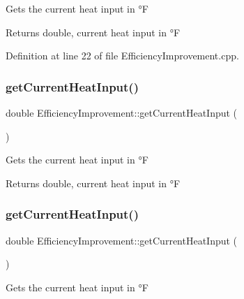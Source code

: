 Gets the current heat input in °F

\begin{DoxyReturn}{Returns}
double, current heat input in °F 
\end{DoxyReturn}


Definition at line 22 of file Efficiency\+Improvement.\+cpp.

\mbox{\label{class_efficiency_improvement_af43c4706cb5cd67ce58e9c4356e4564c}} 
\subsubsection{\texorpdfstring{get\+Current\+Heat\+Input()}{getCurrentHeatInput()}\hspace{0.1cm}{\footnotesize\ttfamily [2/3]}}
{\footnotesize\ttfamily double Efficiency\+Improvement\+::get\+Current\+Heat\+Input (\begin{DoxyParamCaption}{ }\end{DoxyParamCaption})}

Gets the current heat input in °F

\begin{DoxyReturn}{Returns}
double, current heat input in °F 
\end{DoxyReturn}
\mbox{\label{class_efficiency_improvement_af43c4706cb5cd67ce58e9c4356e4564c}} 
\subsubsection{\texorpdfstring{get\+Current\+Heat\+Input()}{getCurrentHeatInput()}\hspace{0.1cm}{\footnotesize\ttfamily [3/3]}}
{\footnotesize\ttfamily double Efficiency\+Improvement\+::get\+Current\+Heat\+Input (\begin{DoxyParamCaption}{ }\end{DoxyParamCaption})}

Gets the current heat input in °F

